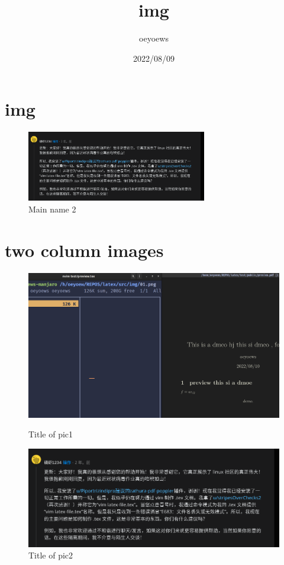 \documentclass{article}
\title{img}
\author{oeyoews}
\date{2022/08/09}
\begin{document}
\maketitle


\section{img}%
\label{sec:img}

\begin{figure}[H] %
\centering %
\includegraphics[width=0.7\textwidth]{img/01.png} %
\caption{Main name 2} %
\label{Fig.main2} %
\end{figure}

\section{two column images}%
\label{sec:two column images}

\begin{figure}[H]
\centering
\begin{minipage}{0.08\textwidth}
\centering
\includegraphics{img/00.png}
\caption{Title of pic1}
\end{minipage}
\begin{minipage}{0.08\textwidth}
\centering
\includegraphics{img/01.png}
\caption{Title of pic2}
\end{minipage}
\end{figure}
\end{document}
